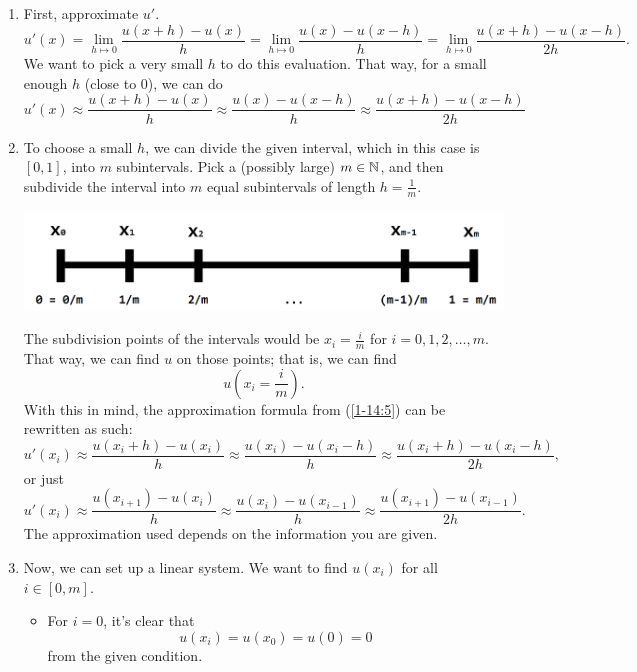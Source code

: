 \documentclass[letterpaper]{article}
\begin{document}
\begin{enumerate}
    \item First, approximate $u'$. 
    \[u'(x) = \lim_{h \mapsto 0} \frac{u(x + h) - u(x)}{h} = \lim_{h \mapsto 0} \frac{u(x) - u(x - h)}{h} = \lim_{h \mapsto 0} \frac{u(x + h) - u(x - h)}{2h}.\]
    We want to pick a very small $h$ to do this evaluation. That way, for a small enough $h$ (close to 0), we can do 
    \begin{equation}\label{1-14:5}
        u'(x) \approx \frac{u(x + h) - u(x)}{h} \approx \frac{u(x) - u(x - h)}{h} \approx \frac{u(x + h) - u(x - h)}{2h}
    \end{equation}

    \item To choose a small $h$, we can divide the given interval, which in this case is $[0, 1]$, into $m$ subintervals. Pick a (possibly large) $m \in \mathbb{N}$, and then subdivide the interval into $m$ equal subintervals of length $h = \frac{1}{m}$. 
    
    \begin{center}
        \includegraphics[scale=0.4]{../assets/sub_divide.png}
    \end{center}
    
    The subdivision points of the intervals would be $x_i = \frac{i}{m}$ for $i = 0, 1, 2, \hdots, m$. That way, we can find $u$ on those points; that is, we can find \[u\left(x_i = \frac{i}{m}\right).\] 
    With this in mind, the approximation formula from (\ref{1-14:5}) can be rewritten as such:
    \[u'(x_i) \approx \frac{u(x_i + h) - u(x_i)}{h} \approx \frac{u(x_i) - u(x_i - h)}{h} \approx \frac{u(x_i + h) - u(x_i - h)}{2h},\]
    or just 
    \[u'(x_i) \approx \frac{u(x_{i + 1}) - u(x_{i})}{h} \approx \frac{u(x_i) - u(x_{i - 1})}{h} \approx \frac{u(x_{i + 1}) - u(x_{i - 1})}{2h}.\] 
    The approximation used depends on the information you are given.
    \item Now, we can set up a linear system. We want to find $u(x_i)$ for all $i \in [0, m]$. 
    \begin{itemize}
        \item For $i = 0$, it's clear that 
        \[u(x_i) = u(x_0) = u(0) = 0\]
        from the given condition.


\end{itemize}
\end{enumerate}
\end{document}
